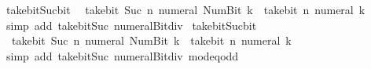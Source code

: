 \begin{isabellebody}
\endisadelimproof
\isanewline
{}\isamarkupfalse%
\ take{\isacharunderscore}{\kern0pt}bit{\isacharunderscore}{\kern0pt}Suc{\isacharunderscore}{\kern0pt}bit{}{\isacharcolon}{\kern0pt}\isanewline
\ \ {\isacartoucheopen}take{\isacharunderscore}{\kern0pt}bit\ {\isacharparenleft}{\kern0pt}Suc\ n{\isacharparenright}{\kern0pt}\ {\isacharparenleft}{\kern0pt}numeral\ {\isacharparenleft}{\kern0pt}Num{\isachardot}{\kern0pt}Bit{}\ k{\isacharparenright}{\kern0pt}{\isacharparenright}{\kern0pt}\ {\isacharequal}{\kern0pt}\ take{\isacharunderscore}{\kern0pt}bit\ n\ {\isacharparenleft}{\kern0pt}numeral\ k{\isacharparenright}{\kern0pt}\ {\isacharasterisk}{\kern0pt}\ {}{\isacartoucheclose}\isanewline
%
\isadelimproof
\ \ %
\endisadelimproof
%
\isatagproof
{}\isamarkupfalse%
\ {\isacharparenleft}{\kern0pt}simp\ add{\isacharcolon}{\kern0pt}\ take{\isacharunderscore}{\kern0pt}bit{\isacharunderscore}{\kern0pt}Suc\ numeral{\isacharunderscore}{\kern0pt}Bit{}{\isacharunderscore}{\kern0pt}div{\isacharunderscore}{\kern0pt}{}{\isacharparenright}{\kern0pt}%
\endisatagproof
{\isafoldproof}%
%
\isadelimproof
\isanewline
%
\endisadelimproof
\isanewline
{}\isamarkupfalse%
\ take{\isacharunderscore}{\kern0pt}bit{\isacharunderscore}{\kern0pt}Suc{\isacharunderscore}{\kern0pt}bit{}{\isacharcolon}{\kern0pt}\isanewline
\ \ {\isacartoucheopen}take{\isacharunderscore}{\kern0pt}bit\ {\isacharparenleft}{\kern0pt}Suc\ n{\isacharparenright}{\kern0pt}\ {\isacharparenleft}{\kern0pt}numeral\ {\isacharparenleft}{\kern0pt}Num{\isachardot}{\kern0pt}Bit{}\ k{\isacharparenright}{\kern0pt}{\isacharparenright}{\kern0pt}\ {\isacharequal}{\kern0pt}\ take{\isacharunderscore}{\kern0pt}bit\ n\ {\isacharparenleft}{\kern0pt}numeral\ k{\isacharparenright}{\kern0pt}\ {\isacharasterisk}{\kern0pt}\ {}\ {\isacharplus}{\kern0pt}\ {}{\isacartoucheclose}\isanewline
%
\isadelimproof
\ \ %
\endisadelimproof
%
\isatagproof
{}\isamarkupfalse%
\ {\isacharparenleft}{\kern0pt}simp\ add{\isacharcolon}{\kern0pt}\ take{\isacharunderscore}{\kern0pt}bit{\isacharunderscore}{\kern0pt}Suc\ numeral{\isacharunderscore}{\kern0pt}Bit{}{\isacharunderscore}{\kern0pt}div{\isacharunderscore}{\kern0pt}{}\ mod{\isacharunderscore}{\kern0pt}{}{\isacharunderscore}{\kern0pt}eq{\isacharunderscore}{\kern0pt}odd{\isacharparenright}{\kern0pt}%
\endisatagproof
{\isafoldproof}%
%
\isadelimproof
\isanewline
%
\endisadelimproof
\isanewline
{}\isamarkupfalse%

\end{isabellebody}
